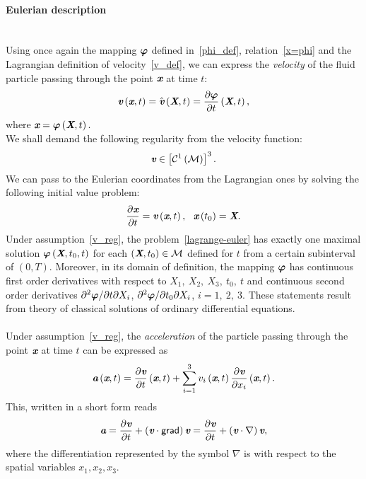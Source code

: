 \paragraph{Eulerian description}\ \\
Using once again the mapping $\boldsymbol{\varphi}$ defined in~\eqref{phi_def}, relation~\eqref{x=phi} and the Lagrangian definition of velocity~\eqref{v_def}, we can express the \textit{velocity} of the fluid particle passing through the point $\textit{\textbf{x}}$ at time $t$: 
\begin{equation}
\textit{\textbf{v}}\left(\textit{\textbf{x}},t\right) = \hat{\textit{\textbf{v}}}\left(\textit{\textbf{X}},t\right) = \frac{\partial{\boldsymbol{\varphi}}}{\partial{t}}\left(\textit{\textbf{X}},t\right),
\end{equation}
where $\textit{\textbf{x}} = \boldsymbol{\varphi}\left(\textit{\textbf{X}},t\right).$ \\
We shall demand the following regularity from the velocity function:
\begin{equation}\label{v_reg}
\textit{\textbf{v}}\in\left[\mathcal{C}^1\left(\mathcal{M}\right)\right]^3.
\end{equation}
We can pass to the Eulerian coordinates from the Lagrangian ones by solving the following initial value problem:
\begin{equation}\label{lagrange-euler}
 \frac{\partial{\textit{\textbf{x}}}}{\partial{t}} = \textit{\textbf{v}}\left(\textit{\textbf{x}},t\right),\ \ \textit{\textbf{x}}\left(t_0\right) = \textit{\textbf{X}}.
\end{equation}
Under assumption~\eqref{v_reg}, the problem~\eqref{lagrange-euler} has exactly one maximal solution $\boldsymbol{\varphi}\left(\textit{\textbf{X}},t_0,t\right)$ for each $\left(\textit{\textbf{X}},t_0\right)\in\mathcal{M}$ defined for $t$ from a certain subinterval of $\left(0,T\right)$. Moreover, in its domain of definition, the mapping $\boldsymbol{\varphi}$ has continuous first order derivatives with respect to $X_1,\ X_2,\ X_3,\ t_0,\ t$ and continuous second order derivatives $\partial^2\boldsymbol{\varphi}/\partial{t}\partial{X_i}$, $\partial^2\boldsymbol{\varphi}/\partial{t_0}\partial{X_i}$, $i = 1,\ 2,\ 3$. These statements result from theory of classical solutions of ordinary differential equations.
\paragraph{}
Under assumption~\eqref{v_reg}, the \textit{acceleration} of the particle passing through the point $\textit{\textbf{x}}$ at time $t$ can be expressed as 
\begin{equation}
 \textit{\textbf{a}}\left(\textit{\textbf{x}},t\right) = \frac{\partial{\textit{\textbf{v}}}}{\partial{t}}\left(\textit{\textbf{x}},t\right) + \sum_{i=1}^{3}v_i\left(\textit{\textbf{x}},t\right)\frac{\partial{\textit{\textbf{v}}}}{\partial{x_i}}\left(\textit{\textbf{x}},t\right).
\end{equation}
This, written in a short form reads
\begin{equation}\label{a_def_2}
 \textit{\textbf{a}}= \frac{\partial{\textit{\textbf{v}}}}{\partial{t}} + \left(\textit{\textbf{v}}\cdot\mathsf{grad}\right)\textit{\textbf{v}} = \frac{\partial{\textit{\textbf{v}}}}{\partial{t}}+\left(\textit{\textbf{v}}\cdot\nabla\right)\textit{\textbf{v}},
\end{equation}
where the differentiation represented by the symbol $\nabla$ is with respect to the spatial variables $x_1,x_2,x_3$.

